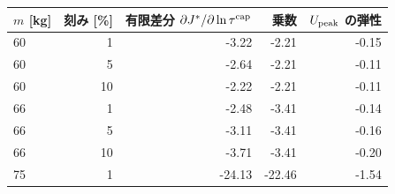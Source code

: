 \begin{tabular}{lrrrr}
\toprule
$m$ [kg] & 刻み [\%] & 有限差分 $\partial J^*/\partial\ln\tau^{\rm cap}$ & 乗数 & $U_{\rm peak}$ の弾性 \\
\midrule
60 & 1 & -3.22 & -2.21 & -0.15 \\
60 & 5 & -2.64 & -2.21 & -0.11 \\
60 & 10 & -2.22 & -2.21 & -0.11 \\
66 & 1 & -2.48 & -3.41 & -0.14 \\
66 & 5 & -3.11 & -3.41 & -0.16 \\
66 & 10 & -3.71 & -3.41 & -0.20 \\
75 & 1 & -24.13 & -22.46 & -1.54 \\
\bottomrule
\end{tabular}

